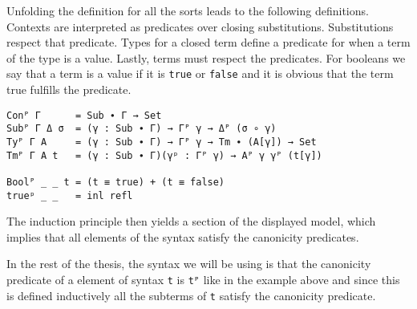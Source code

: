 Unfolding the definition for all the sorts leads to the following definitions. Contexts are interpreted as predicates over closing substitutions. Substitutions respect that predicate. Types for a closed term define a predicate for when a term of the type is a value. Lastly, terms must respect the predicates. For booleans we say that a term is a value if it is \texttt{true} or \texttt{false} and it is obvious that the term true fulfills the predicate.

\begin{verbatim}
Conᴾ Γ      = Sub ∙ Γ → Set
Subᴾ Γ Δ σ  = (γ : Sub ∙ Γ) → Γᴾ γ → Δᴾ (σ ∘ γ)
Tyᴾ Γ A     = (γ : Sub ∙ Γ) → Γᴾ γ → Tm ∙ (A[γ]) → Set
Tmᴾ Γ A t   = (γ : Sub ∙ Γ)(γᵖ : Γᴾ γ) → Aᴾ γ γᴾ (t[γ])

Boolᴾ _ _ t = (t ≡ true) + (t ≡ false)
trueᵖ _ _   = inl refl
\end{verbatim}

The induction principle then yields a section of the displayed model, which implies that all elements of the syntax satisfy the canonicity predicates.

In the rest of the thesis, the syntax we will be using is that the canonicity predicate of a element of syntax \texttt{t} is \texttt{tᴾ} like in the example above and since this is defined inductively all the subterms of \texttt{t} satisfy the canonicity predicate.
